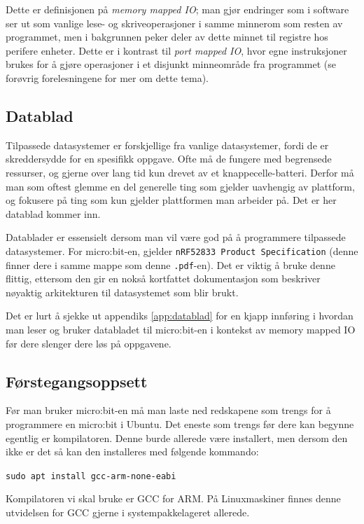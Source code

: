 \begin{alphasection}
Dette er definisjonen på \textit{memory mapped IO}; man gjør endringer som i software ser ut som vanlige lese- og skriveoperasjoner i samme minnerom som resten av programmet, men i bakgrunnen peker deler av dette minnet til registre hos perifere enheter. Dette er i kontrast til \textit{port mapped IO}, hvor egne instruksjoner brukes for å gjøre operasjoner i et disjunkt minneområde fra programmet (se forøvrig forelesningene for mer om dette tema).

\subsection{Datablad}


Tilpassede datasystemer er forskjellige fra vanlige datasystemer, fordi de er skreddersydde for en spesifikk oppgave. Ofte må de fungere med begrensede ressurser, og gjerne over lang tid kun drevet av et knappecelle-batteri. Derfor må man som oftest glemme en del generelle ting som gjelder uavhengig av plattform, og fokusere på ting som kun gjelder plattformen man arbeider på. Det er her datablad kommer inn.

Datablader er essensielt dersom man vil være god på å programmere tilpassede datasystemer. For micro:bit-en, gjelder \texttt{nRF52833 Product Specification} (denne finner dere i samme mappe som denne \verb|.pdf|-en). Det er viktig å bruke denne flittig, ettersom den gir en nokså kortfattet dokumentasjon som beskriver nøyaktig arkitekturen til datasystemet som blir brukt.

Det er lurt å sjekke ut appendiks \ref{app:datablad} for en kjapp innføring i hvordan man leser og bruker databladet til micro:bit-en i kontekst av memory mapped IO før dere slenger dere løs på oppgavene. 




\subsection{Førstegangsoppsett}


Før man bruker micro:bit-en må man laste ned redskapene som trengs for å programmere en micro:bit i Ubuntu. Det eneste som trengs før dere kan begynne egentlig er kompilatoren. Denne burde allerede være installert, men dersom den ikke er det så kan den installeres med følgende kommando:


\verb|sudo apt install gcc-arm-none-eabi|

Kompilatoren vi skal bruke er GCC for ARM. På Linuxmaskiner finnes
denne utvidelsen for GCC gjerne i systempakkelageret allerede. 


\end{alphasection}
